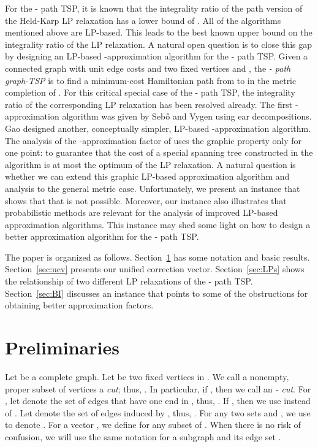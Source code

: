 \documentclass[11pt]{article}
\begin{document}
For the - path TSP, it is known that the integrality ratio
of the path version of the Held-Karp LP relaxation has a lower bound
of . All of the algorithms mentioned above are LP-based.
This leads to the best known upper bound  on the integrality
ratio of the LP relaxation. A natural open question is to close this
gap by designing an LP-based -approximation algorithm
for the - path TSP. Given a connected graph  with unit
edge costs and two fixed vertices  and , the \emph{-
path graph-TSP} is to find a minimum-cost Hamiltonian path from 
to  in the metric completion of . For this critical special
case of the - path TSP, the integrality ratio of the corresponding
LP relaxation has been resolved already. The first
-approximation algorithm was given by Seb\H{o} and Vygen
\cite{SV12} using ear decompositions.  Gao \cite{Gao13} designed
another, conceptually simpler, LP-based
-approximation algorithm.
The analysis of the -approximation factor of \cite{Gao13}
uses the graphic property only for one point: to guarantee that the
cost of a special spanning tree constructed in the algorithm is at
most the optimum of the LP relaxation. A natural question is whether we can
extend this graphic LP-based approximation algorithm and analysis
to the general metric case. Unfortunately, we present an instance
that shows that that is not possible.  Moreover, our instance also illustrates that probabilistic methods
are relevant for the analysis of improved LP-based approximation
algorithms.  This instance may shed some
light on how to design a better approximation algorithm for the
- path TSP.

The paper is organized as follows. Section~\ref{sec:pre} has some
notation and basic results. Section~\ref{sec:ucv} presents our
unified correction vector. Section~\ref{sec:LPs} shows the relationship
of two different LP relaxations of the - path TSP.
Section~\ref{sec:BI} discusses an instance that points to some
of the obstructions for obtaining better approximation factors.



\section{Preliminaries}\label{sec:pre}

Let  be a complete graph.
Let  be two fixed vertices in .
We call a nonempty, proper subset of vertices  a \emph{cut};
thus, .
In particular, if ,
then we call  an \emph{- cut}.
For , let  denote the set of edges
that have one end in , thus,
.
If , then we use  instead of .
Let  denote the set of edges induced by , thus,
.
For any two sets  and ,
we use  to denote . For a vector , we define 
for any subset  of . When there is no risk of confusion, we will use the same notation  for a subgraph  and its edge set .
\end{document}
